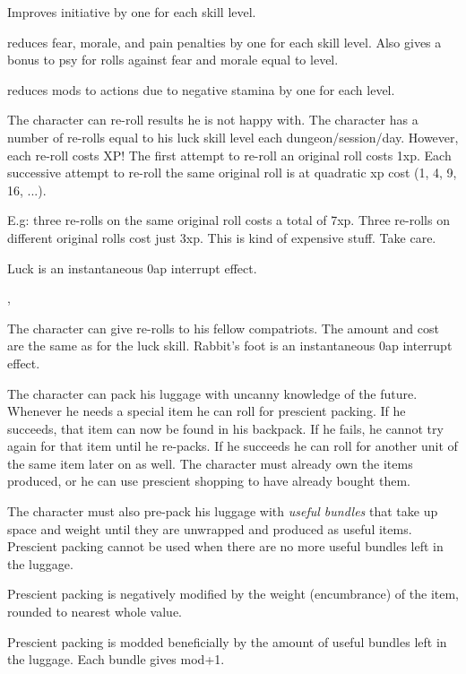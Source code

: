  Improves initiative by one for each skill level.


 reduces fear, morale, and pain penalties by one for each skill level. Also gives a bonus to psy for rolls against fear and morale equal to level.


 reduces mods to actions due to negative stamina by one for each level.


 The character can re-roll results he is not happy with. The character has a number of re-rolls equal to his luck skill level each dungeon/session/day. However, each re-roll costs XP! The first attempt to re-roll an original roll costs 1xp. Each successive attempt to re-roll the same original roll is at quadratic xp cost (1, 4, 9, 16, ...).

E.g: three re-rolls on the same original roll costs a total of 7xp. Three re-rolls on different original rolls cost just 3xp. This is kind of expensive stuff. Take care.

Luck is an instantaneous 0ap interrupt effect.


, 

 The character can give re-rolls to his fellow compatriots. The amount and cost are the same as for the luck skill.
Rabbit's foot is an instantaneous 0ap interrupt effect.


 The character can pack his luggage with uncanny knowledge of the future. Whenever he needs a special item he can roll for prescient packing. If he succeeds, that item can now be found in his backpack. If he fails, he cannot try again for that item until he re-packs. If he succeeds he can roll for another unit of the same item later on as well.
The character must already own the items produced, or he can use prescient shopping to have already bought them.

The character must also pre-pack his luggage with \emph{useful bundles} that take up space and weight until they are unwrapped and produced as useful items. Prescient packing cannot be used when there are no more useful bundles left in the luggage.

Prescient packing is negatively modified by the weight (encumbrance) of the item, rounded to nearest whole value.

Prescient packing is modded beneficially by the amount of useful bundles left in the luggage. Each bundle gives mod+1.

